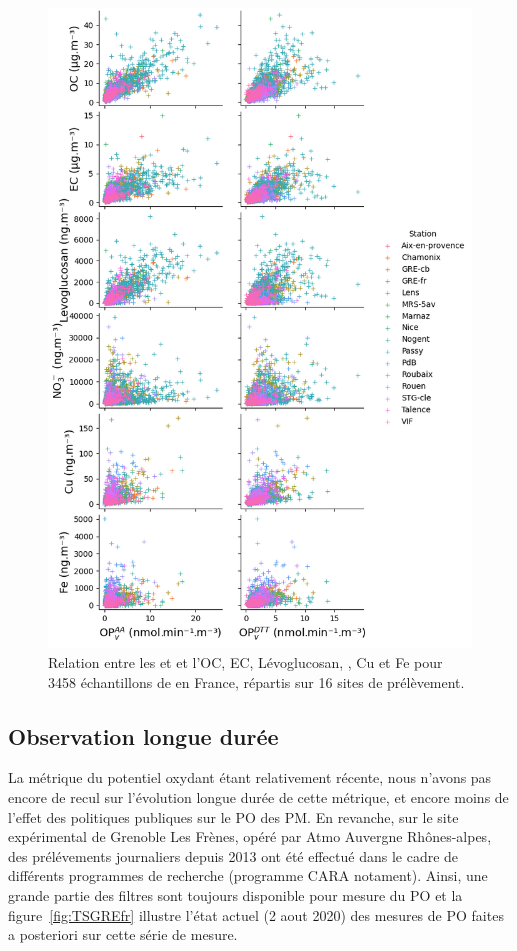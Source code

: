 \begin{figure}[ht]
    \centering
    \includegraphics[width=0.7\linewidth]{figures/chapter04/pairplot_OPs.png}
    \caption{Relation entre les \POAAv{} et \PODTTv{} et l'OC, EC, Lévoglucosan, \NOt, Cu et Fe pour
    3458 échantillons de \PMdix{} en France, répartis sur 16 sites de prélèvement.}%
    \label{fig:pairplotOPs}
\end{figure}

\clearpage
\subsection{Observation longue durée}%
\label{sub:observation_longue_duree}

La métrique du potentiel oxydant étant relativement récente, nous n'avons pas encore de
recul sur l'évolution longue durée de cette métrique, et encore moins de l'effet des
politiques publiques sur le PO des PM. En revanche, sur le site expérimental de Grenoble
Les Frènes, opéré par Atmo Auvergne Rhônes-alpes, des prélévements journaliers depuis 2013
ont été effectué dans le cadre de différents programmes de recherche (programme CARA
notament). Ainsi, une grande partie des filtres sont toujours disponible pour mesure du PO et
la figure~\ref{fig:TSGREfr} illustre l'état actuel (2 aout 2020) des mesures de PO faites a
posteriori sur cette série de mesure.

